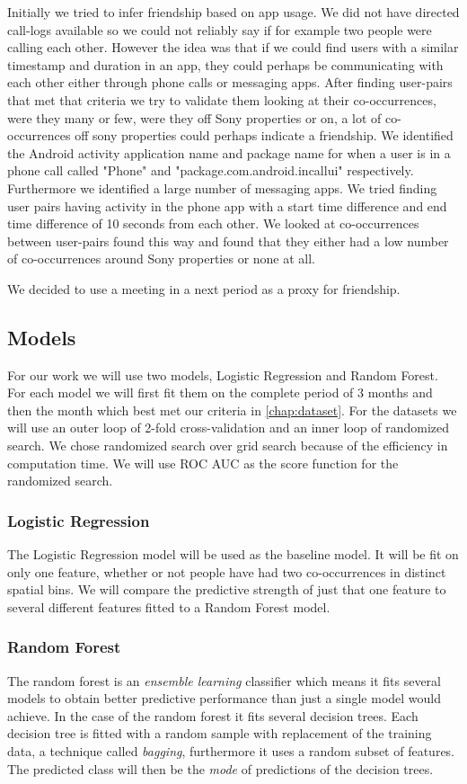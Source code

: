 Initially we tried to infer friendship based on app usage. We did not have directed call-logs available so we could not reliably say if for example two people were calling each other. However the idea was that if we could find users with a similar timestamp and duration in an app, they could perhaps be communicating with each other either through phone calls or messaging apps. After finding user-pairs that met that criteria we try to validate them looking at their co-occurrences, were they many or few, were they off Sony properties or on, a lot of co-occurrences off sony properties could perhaps indicate a friendship. We identified the Android activity application name and package name for when a user is in a phone call called "Phone" and "package.com.android.incallui" respectively. Furthermore we identified a large number of messaging apps. We tried finding user pairs having activity in the phone app with a start time difference and end time difference of 10 seconds from each other. We looked at co-occurrences between user-pairs found this way and found that they either had a low number of co-occurrences around Sony properties or none at all.

We decided to use a meeting in a next period as a proxy for friendship.

\subsection{Models}
For our work we will use two models, Logistic Regression and Random Forest. For each model we will first fit them on the complete period of 3 months and then the month which best met our criteria in \autoref{chap:dataset}. For the datasets we will use an outer loop of 2-fold cross-validation and an inner loop of randomized search. We chose randomized search over grid search because of the efficiency in computation time. We will use ROC AUC as the score function for the randomized search.

\subsubsection{Logistic Regression}
The Logistic Regression model will be used as the baseline model. It will be fit on only one feature, whether or not people have had two co-occurrences in distinct spatial bins. We will compare the predictive strength of just that one feature to several different features fitted to a Random Forest model.

\subsubsection{Random Forest}
The random forest is an \textit{ensemble learning} classifier which means it fits several models to obtain better predictive performance than just a single model would achieve. In the case of the random forest it fits several decision trees. Each decision tree is fitted with a random sample with replacement of the training data, a technique called \textit{bagging}, furthermore it uses a random subset of features. The predicted class will then be the \textit{mode} of predictions of the decision trees.


